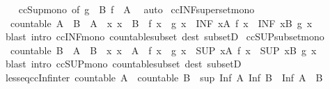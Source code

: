 \begin{isabellebody}
%
\isadelimproof
\ \ %
\endisadelimproof
%
\isatagproof
{}\isamarkupfalse%
\ ccSup{\isacharunderscore}mono\ {\isacharbrackleft}of\ {\isachardoublequoteopen}g\ {\isacharbackquote}\ B{\isachardoublequoteclose}\ {\isachardoublequoteopen}f\ {\isacharbackquote}\ A{\isachardoublequoteclose}{\isacharbrackright}\ \isamarkupfalse%
\ auto%
\endisatagproof
{\isafoldproof}%
%
\isadelimproof
\isanewline
%
\endisadelimproof
\isanewline
{}\isamarkupfalse%
\ ccINF{\isacharunderscore}superset{\isacharunderscore}mono{\isacharcolon}\isanewline
\ \ {\isachardoublequoteopen}countable\ A\ {\isasymLongrightarrow}\ B\ {\isasymsubseteq}\ A\ {\isasymLongrightarrow}\ {\isacharparenleft}{\isasymAnd}x{\isachardot}\ x\ {\isasymin}\ B\ {\isasymLongrightarrow}\ f\ x\ {\isasymle}\ g\ x{\isacharparenright}\ {\isasymLongrightarrow}\ {\isacharparenleft}INF\ x{\isasymin}A{\isachardot}\ f\ x{\isacharparenright}\ {\isasymle}\ {\isacharparenleft}INF\ x{\isasymin}B{\isachardot}\ g\ x{\isacharparenright}{\isachardoublequoteclose}\isanewline
%
\isadelimproof
\ \ %
\endisadelimproof
%
\isatagproof
{}\isamarkupfalse%
\ {\isacharparenleft}blast\ intro{\isacharcolon}\ ccINF{\isacharunderscore}mono\ countable{\isacharunderscore}subset\ dest{\isacharcolon}\ subsetD{\isacharparenright}%
\endisatagproof
{\isafoldproof}%
%
\isadelimproof
\isanewline
%
\endisadelimproof
\isanewline
{}\isamarkupfalse%
\ ccSUP{\isacharunderscore}subset{\isacharunderscore}mono{\isacharcolon}\isanewline
\ \ {\isachardoublequoteopen}countable\ B\ {\isasymLongrightarrow}\ A\ {\isasymsubseteq}\ B\ {\isasymLongrightarrow}\ {\isacharparenleft}{\isasymAnd}x{\isachardot}\ x\ {\isasymin}\ A\ {\isasymLongrightarrow}\ f\ x\ {\isasymle}\ g\ x{\isacharparenright}\ {\isasymLongrightarrow}\ {\isacharparenleft}SUP\ x{\isasymin}A{\isachardot}\ f\ x{\isacharparenright}\ {\isasymle}\ {\isacharparenleft}SUP\ x{\isasymin}B{\isachardot}\ g\ x{\isacharparenright}{\isachardoublequoteclose}\isanewline
%
\isadelimproof
\ \ %
\endisadelimproof
%
\isatagproof
{}\isamarkupfalse%
\ {\isacharparenleft}blast\ intro{\isacharcolon}\ ccSUP{\isacharunderscore}mono\ countable{\isacharunderscore}subset\ dest{\isacharcolon}\ subsetD{\isacharparenright}%
\endisatagproof
{\isafoldproof}%
%
\isadelimproof
\isanewline
%
\endisadelimproof
\isanewline
\isanewline
{}\isamarkupfalse%
\ less{\isacharunderscore}eq{\isacharunderscore}ccInf{\isacharunderscore}inter{\isacharcolon}\ {\isachardoublequoteopen}countable\ A\ {\isasymLongrightarrow}\ countable\ B\ {\isasymLongrightarrow}\ sup\ {\isacharparenleft}Inf\ A{\isacharparenright}\ {\isacharparenleft}Inf\ B{\isacharparenright}\ {\isasymle}\ Inf\ {\isacharparenleft}A\ {\isasyminter}\ B{\isacharparenright}{\isachardoublequoteclose}\isanewline

\end{isabellebody}
